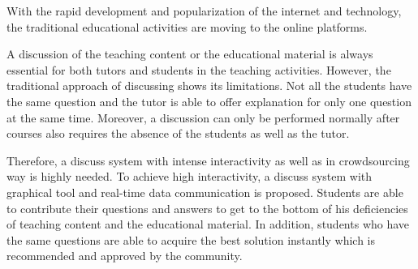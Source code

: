 With the rapid development and popularization of the internet and technology, the traditional educational activities are moving to the online platforms.

A discussion of the teaching content or the educational material is always essential for both tutors and students in the teaching activities. However, the traditional approach of discussing shows its limitations. Not all the students have the same question and the tutor is able to offer explanation for only one question at the same time. Moreover, a discussion can only be performed normally after courses also requires the absence of the students as well as the tutor.

Therefore, a discuss system with intense interactivity as well as in crowdsourcing way is highly needed. To achieve high interactivity, a discuss system with graphical tool and real-time data communication is proposed. Students are able to contribute their questions and answers to get to the bottom of his deficiencies of teaching content and the educational material. In addition, students who have the same questions are able to  acquire the best solution instantly which is recommended and approved by the community.

